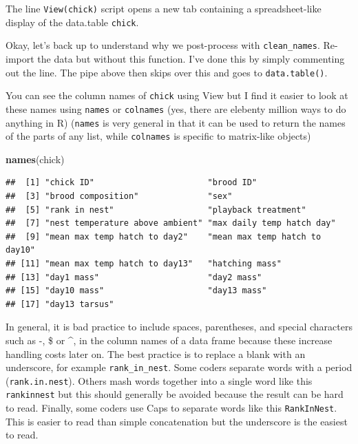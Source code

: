 \documentclass[]{book}
\newenvironment{Shaded}{\begin{snugshade}}{\end{snugshade}}
\newcommand{\CommentTok}[1]{\textcolor[rgb]{0.56,0.35,0.01}{\textit{#1}}}
\newcommand{\DataTypeTok}[1]{\textcolor[rgb]{0.13,0.29,0.53}{#1}}
\newcommand{\KeywordTok}[1]{\textcolor[rgb]{0.13,0.29,0.53}{\textbf{#1}}}
\newcommand{\NormalTok}[1]{#1}
\newcommand{\OperatorTok}[1]{\textcolor[rgb]{0.81,0.36,0.00}{\textbf{#1}}}
\newcommand{\StringTok}[1]{\textcolor[rgb]{0.31,0.60,0.02}{#1}}
\begin{document}
The line \texttt{View(chick)} script opens a new tab containing a spreadsheet-like display of the data.table \texttt{chick}.

Okay, let's back up to understand why we post-process with \texttt{clean\_names}. Re-import the data but without this function. I've done this by simply commenting out the line. The pipe above then skips over this and goes to \texttt{data.table()}.

\begin{Shaded}
\end{Shaded}

You can see the column names of \texttt{chick} using View but I find it easier to look at these names using \texttt{names} or \texttt{colnames} (yes, there are elebenty million ways to do anything in R) (\texttt{names} is very general in that it can be used to return the names of the parts of any list, while \texttt{colnames} is specific to matrix-like objects)

\begin{Shaded}
\begin{Highlighting}[]
\KeywordTok{names}\NormalTok{(chick)}
\end{Highlighting}
\end{Shaded}

\begin{verbatim}
##  [1] "chick ID"                       "brood ID"                      
##  [3] "brood composition"              "sex"                           
##  [5] "rank in nest"                   "playback treatment"            
##  [7] "nest temperature above ambient" "max daily temp hatch day"      
##  [9] "mean max temp hatch to day2"    "mean max temp hatch to day10"  
## [11] "mean max temp hatch to day13"   "hatching mass"                 
## [13] "day1 mass"                      "day2 mass"                     
## [15] "day10 mass"                     "day13 mass"                    
## [17] "day13 tarsus"
\end{verbatim}

In general, it is bad practice to include spaces, parentheses, and special characters such as -, \$ or \^{}, in the column names of a data frame because these increase handling costs later on. The best practice is to replace a blank with an underscore, for example \texttt{rank\_in\_nest}. Some coders separate words with a period (\texttt{rank.in.nest}). Others mash words together into a single word like this \texttt{rankinnest} but this should generally be avoided because the result can be hard to read. Finally, some coders use Caps to separate words like this \texttt{RankInNest}. This is easier to read than simple concatenation but the underscore is the easiest to read.
\end{document}
